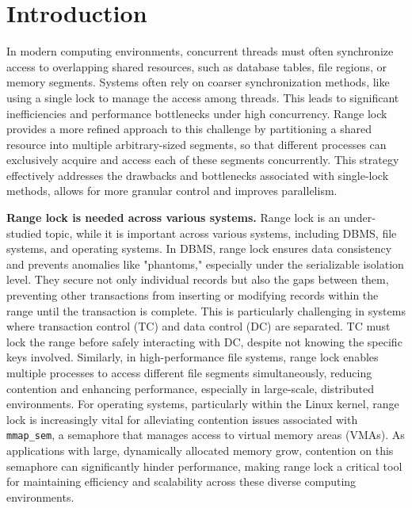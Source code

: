 \chapter{Introduction}\label{chapter:introduction}

In modern computing environments, concurrent threads must often synchronize access to overlapping shared resources, such as database tables, file regions, or memory segments. 
Systems often rely on coarser synchronization methods, like using a single lock to manage the access among threads. 
This leads to significant inefficiencies and performance bottlenecks under high concurrency. 
Range lock~\parencite{gao2023citron, kogan2020scalable, song2013parallelizing} provides a more refined approach to this challenge by partitioning a shared resource into multiple arbitrary-sized segments, so that different processes can exclusively acquire and access each of these segments concurrently. 
This strategy effectively addresses the drawbacks and bottlenecks associated with single-lock methods, allows for more granular control and improves parallelism.

\textbf{Range lock is needed across various systems.}
Range lock is an under-studied topic, while it is important across various systems, including DBMS, file systems, and operating systems. 
In DBMS, range lock ensures data consistency and prevents anomalies like "phantoms," especially under the serializable isolation level. 
They secure not only individual records but also the gaps between them, preventing other transactions from inserting or modifying records within the range until the transaction is complete. 
This is particularly challenging in systems where transaction control (TC) and data control (DC) are separated. 
TC must lock the range before safely interacting with DC, despite not knowing the specific keys involved. 
Similarly, in high-performance file systems, range lock enables multiple processes to access different file segments simultaneously, reducing contention and enhancing performance, especially in large-scale, distributed environments. 
For operating systems, particularly within the Linux kernel, range lock is increasingly vital for alleviating contention issues associated with \texttt{mmap\_sem}, a semaphore that manages access to virtual memory areas (VMAs). 
As applications with large, dynamically allocated memory grow, contention on this semaphore can significantly hinder performance, making range lock a critical tool for maintaining efficiency and scalability across these diverse computing environments.


